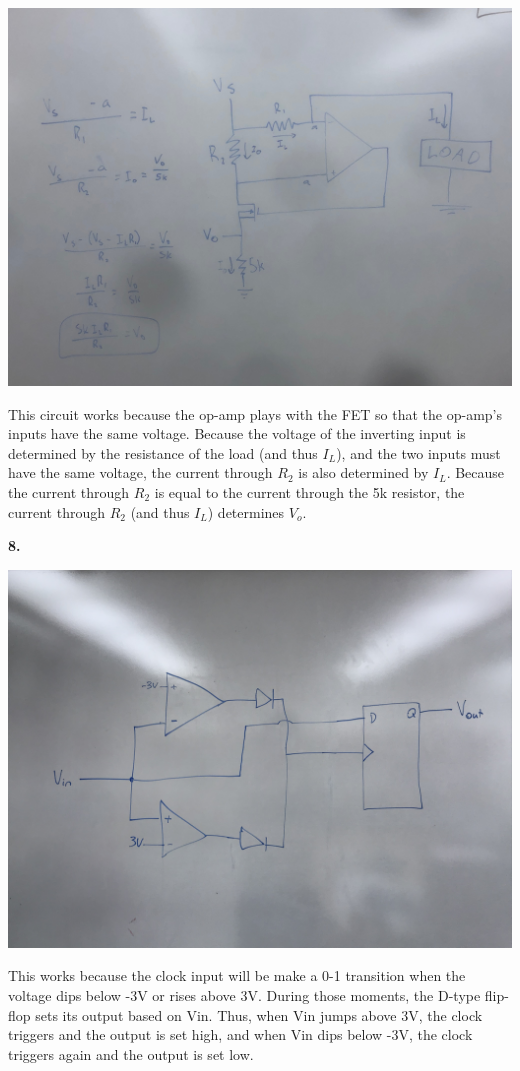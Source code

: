 \documentclass{article}
\begin{document}
    \begin{center} \includegraphics[scale=.2]{3.jpg} \end{center}

    This circuit works because the op-amp plays with the FET so that the op-amp's inputs have the same voltage.
    Because the voltage of the inverting input is determined by the resistance of the load (and thus $I_L$), and the two inputs must have the same voltage, the current through $R_2$ is also determined by $I_L$.
    Because the current through $R_2$ is equal to the current through the 5k resistor, the current through $R_2$ (and thus $I_L$) determines $V_o$.

\newpage\noindent\textbf{8.}

    \begin{center} \includegraphics[scale=.12]{4.jpg} \end{center}

    This works because the clock input will be make a 0-1 transition when the voltage dips below -3V or rises above 3V.
    During those moments, the D-type flip-flop sets its output based on Vin.
    Thus, when Vin jumps above 3V, the clock triggers and the output is set high, and when Vin dips below -3V, the clock triggers again and the output is set low.
\end{document}
